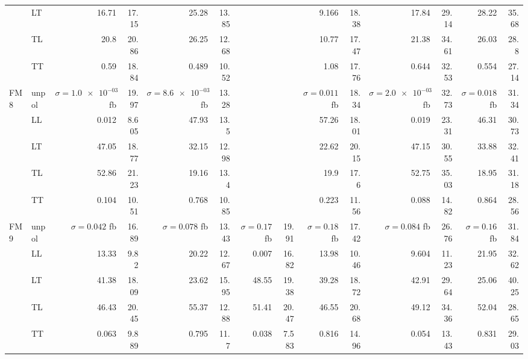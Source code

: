 \begin{table}[H]
{\begin{tabular}{llrrrrrrrrrrrr}
 & LT & \num{16.71} & \num{17.15} & \num{25.28} & \num{13.85} &  &  & \num{9.166} & \num{18.38} & \num{17.84} & \num{29.14} & \num{28.22} & \num{35.68} \\
 & TL & \num{20.8} & \num{20.86} & \num{26.25} & \num{12.68} &  &  & \num{10.77} & \num{17.47} & \num{21.38} & \num{34.61} & \num{26.03} & \num{28.8} \\
 & TT & \num{0.59} & \num{18.84} & \num{0.489} & \num{10.52} &  &  & \num{1.08} & \num{17.76} & \num{0.644} & \num{32.53} & \num{0.554} & \num{27.14} \\
\midrule
\multirow{5}{*}{FM8}
 & unpol & $\sigma = \num{1.0e-03}$ fb & \num{19.97} & $\sigma = \num{8.6e-03}$ fb & \num{13.28} &  &  & $\sigma = \num{0.011}$ fb & \num{18.34} & $\sigma = \num{2.0e-03}$ fb & \num{32.73} & $\sigma = \num{0.018}$ fb & \num{31.34} \\
 & LL & \num{0.012} & \num{8.605} & \num{47.93} & \num{13.5} &  &  & \num{57.26} & \num{18.01} & \num{0.019} & \num{23.31} & \num{46.31} & \num{30.73} \\
 & LT & \num{47.05} & \num{18.77} & \num{32.15} & \num{12.98} &  &  & \num{22.62} & \num{20.15} & \num{47.15} & \num{30.55} & \num{33.88} & \num{32.41} \\
 & TL & \num{52.86} & \num{21.23} & \num{19.16} & \num{13.4} &  &  & \num{19.9} & \num{17.6} & \num{52.75} & \num{35.03} & \num{18.95} & \num{31.18} \\
 & TT & \num{0.104} & \num{10.51} & \num{0.768} & \num{10.85} &  &  & \num{0.223} & \num{11.56} & \num{0.088} & \num{14.82} & \num{0.864} & \num{28.56} \\
\midrule
\multirow{5}{*}{FM9}
 & unpol & $\sigma = \num{0.042}$ fb & \num{16.89} & $\sigma = \num{0.078}$ fb & \num{13.43} & $\sigma = \num{0.17}$ fb & \num{19.91} & $\sigma = \num{0.18}$ fb & \num{17.42} & $\sigma = \num{0.084}$ fb & \num{26.76} & $\sigma = \num{0.16}$ fb & \num{31.84} \\
 & LL & \num{13.33} & \num{9.82} & \num{20.22} & \num{12.67} & \num{0.007} & \num{16.82} & \num{13.98} & \num{10.46} & \num{9.604} & \num{11.23} & \num{21.95} & \num{32.62} \\
 & LT & \num{41.38} & \num{18.09} & \num{23.62} & \num{15.95} & \num{48.55} & \num{19.38} & \num{39.28} & \num{18.72} & \num{42.91} & \num{29.64} & \num{25.06} & \num{40.25} \\
 & TL & \num{46.43} & \num{20.45} & \num{55.37} & \num{12.88} & \num{51.41} & \num{20.47} & \num{46.55} & \num{20.68} & \num{49.12} & \num{34.36} & \num{52.04} & \num{28.65} \\
 & TT & \num{0.063} & \num{9.889} & \num{0.795} & \num{11.7} & \num{0.038} & \num{7.583} & \num{0.816} & \num{14.96} & \num{0.054} & \num{13.43} & \num{0.831} & \num{29.03} \\
\bottomrule
\end{tabular}
}%
\end{table}